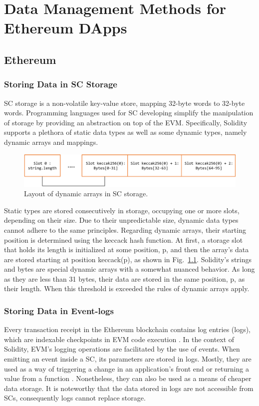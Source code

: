\chapter{Data Management Methods for Ethereum DApps}\label{chapter:data_management}

\section{Ethereum}\label{sec:}


\subsection{Storing Data in SC Storage}\label{sec:sc_storage}
SC storage is a non-volatile key-value store, mapping 32-byte words to 32-byte words. Programming languages used for SC developing simplify the manipulation of storage by providing an abstraction on top of the EVM. Specifically, Solidity supports a plethora of static data types as well as some dynamic types, namely dynamic arrays and mappings.

\begin{figure}[htbp]
\centerline{\includegraphics[width=\textwidth]{figs/Storage.pdf}}
\caption{Layout of dynamic arrays in SC storage.}
\label{fig:arrays}
\end{figure}

Static types are stored consecutively in storage, occupying one or more slots, depending on their size. Due to their unpredictable size, dynamic data types cannot adhere to the same principles. Regarding dynamic arrays, their starting position is determined using the keccack hash function. At first, a storage slot that holds its length is initialized at some position, p, and then the array’s data are stored starting at position keccack(p), as shown in Fig.~\ref{fig:arrays}. Solidity’s strings and bytes are special dynamic arrays with a somewhat nuanced behavior. As long as they are less than 31 bytes, their data are stored in the same position, p, as their length. When this threshold is exceeded the rules of dynamic arrays apply.

\subsection{Storing Data in Event-logs}\label{subsection:}
Every transaction receipt in the Ethereum blockchain contains log entries (logs), which are indexable checkpoints in EVM code execution  \citep{wood_2014}. In the context of Solidity, EVM’s logging operations are facilitated by the use of events. When emitting an event inside a SC, its parameters are stored in logs. Mostly, they are used as a way of triggering a change in an application’s front end or returning a value from a function  \citep{consensys}. Nonetheless, they can also be used as a means of cheaper data storage. It is noteworthy that the data stored in logs are not accessible from SCs, consequently logs cannot replace storage.

